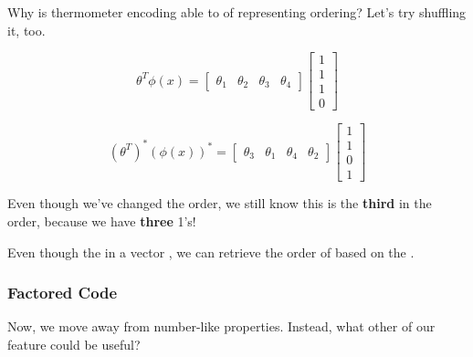                 Why is thermometer encoding able to of representing ordering? Let's try shuffling it, too.

                \begin{equation}
                    \theta^T \phi(x) = 
                    \begin{bmatrix}
                        \theta_1 & \theta_2 & \theta_3 & \theta_4
                    \end{bmatrix}
                    \begin{bmatrix}
                        1\\1\\1\\0
                    \end{bmatrix}
                \end{equation}

                \begin{equation}
                    (\theta^T)^* (\phi(x))^* = 
                    \begin{bmatrix}
                        \theta_3 & \theta_1 & \theta_4 & \theta_2
                    \end{bmatrix}
                    \begin{bmatrix}
                        1 \\ 1 \\ 0 \\ 1
                    \end{bmatrix}
                \end{equation}

                Even though we've changed the order, we still know this is the \textbf{third} in the order, because we have \textbf{three} 1's!\\

                \begin{concept}
                    Even though the  in a vector , we can retrieve the order of  based on the .
                \end{concept}
            
            \subsecdiv
            \subsubsection{Factored Code}

                Now, we move away from number-like properties. Instead, what other  of our feature could be useful?

